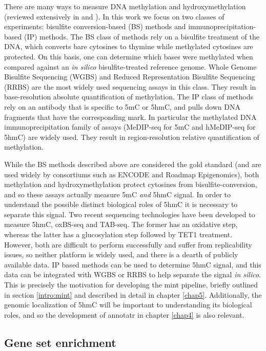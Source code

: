 There are many ways to measure DNA methylation and hydroxymethylation (reviewed extensively in \cite{Yong:2016jw} and \cite{Bock:2012kr}). In this work we focus on two classes of experiments: bisulfite conversion-based (BS) methods and immunoprecipitation-based (IP) methods. The BS class of methods rely on a bisulfite treatment of the DNA, which converts bare cytosines to thymine while methylated cytosines are protected. On this basis, one can determine which bases were methylated when compared against an \emph{in silico} bisulfite-treated reference genome. Whole Genome Bisulfite Sequencing (WGBS) and Reduced Representation Bisulfite Sequencing (RRBS) are the most widely used sequencing assays in this class. They result in base-resolution absolute quantification of methylation. The IP class of methods rely on an antibody that is specific to 5mC or 5hmC, and pulls down DNA fragments that have the corresponding mark. In particular the methylated DNA immunoprecipitation family of assays (MeDIP-seq for 5mC and hMeDIP-seq for 5hmC) are widely used. They result in region-resolution relative quantification of methylation.

While the BS methods described above are considered the gold standard (and are used widely by consortiums such as ENCODE and Roadmap Epigenomics), both methylation and hydroxymethylation protect cytosines from bisulfite-conversion, and so these assays actually measure 5mC \emph{and} 5hmC signal. In order to understand the possible distinct biological roles of 5hmC it is necessary to separate this signal. Two recent sequencing technologies have been developed to measure 5hmC, oxBS-seq and TAB-seq. The former has an oxidative step, whereas the latter has a glucosylation step followed by TET1 treatment. However, both are difficult to perform successfully and suffer from replicability issues, so neither platform is widely used, and there is a dearth of publicly available data. IP based methods can be used to determine 5hmC signal, and this data can be integrated with WGBS or RRBS to help separate the signal \emph{in silico}. This is precisely the motivation for developing the mint pipeline, briefly outlined in section \ref{intro:mint} and described in detail in chapter \ref{chap5}. Additionally, the genomic localization of 5hmC will be important to understanding its biological roles, and so the development of annotatr in chapter \ref{chap4} is also relevant.

\subsection{Gene set enrichment}

